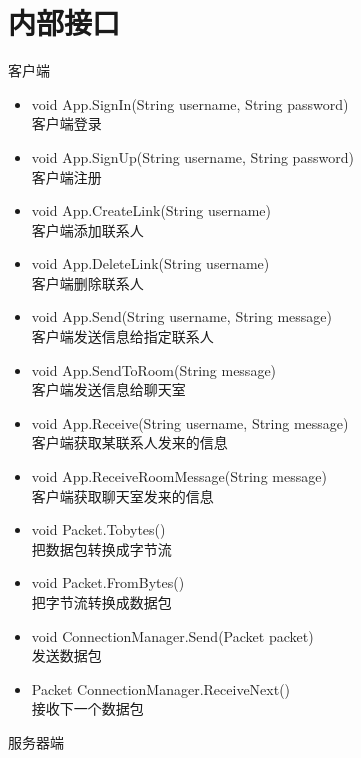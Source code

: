 \section{内部接口}
客户端
\begin{itemize}
	\item void App.SignIn(String username, String password) \\
	客户端登录
	\item void App.SignUp(String username, String password) \\
	客户端注册
	\item void App.CreateLink(String username)\\
	客户端添加联系人
	\item void App.DeleteLink(String username)\\
	客户端删除联系人
	\item void App.Send(String username, String message)\\
	客户端发送信息给指定联系人
	\item void App.SendToRoom(String message)\\
	客户端发送信息给聊天室
	\item void App.Receive(String username, String message)\\
	客户端获取某联系人发来的信息
	\item void App.ReceiveRoomMessage(String message)\\
	客户端获取聊天室发来的信息	
	\item void Packet.Tobytes() \\
	把数据包转换成字节流
	\item void Packet.FromBytes() \\
	把字节流转换成数据包
	\item void ConnectionManager.Send(Packet packet)\\
	发送数据包
	\item Packet ConnectionManager.ReceiveNext() \\
	接收下一个数据包
\end{itemize}
服务器端
